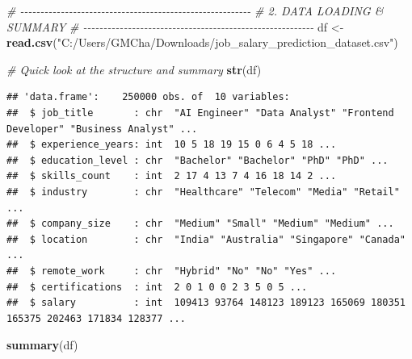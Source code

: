 \documentclass[
]{article}
\newenvironment{Shaded}{\begin{snugshade}}{\end{snugshade}}
\newcommand{\CommentTok}[1]{\textcolor[rgb]{0.56,0.35,0.01}{\textit{#1}}}
\newcommand{\FunctionTok}[1]{\textcolor[rgb]{0.13,0.29,0.53}{\textbf{#1}}}
\newcommand{\NormalTok}[1]{#1}
\newcommand{\OtherTok}[1]{\textcolor[rgb]{0.56,0.35,0.01}{#1}}
\newcommand{\StringTok}[1]{\textcolor[rgb]{0.31,0.60,0.02}{#1}}
\begin{document}
\begin{Shaded}
\begin{Highlighting}[]
\CommentTok{\# {-}{-}{-}{-}{-}{-}{-}{-}{-}{-}{-}{-}{-}{-}{-}{-}{-}{-}{-}{-}{-}{-}{-}{-}{-}{-}{-}{-}{-}{-}{-}{-}{-}{-}{-}{-}{-}{-}{-}{-}{-}{-}{-}{-}{-}{-}{-}{-}{-}{-}{-}{-}{-}{-}{-}{-}{-}}
\CommentTok{\# 2. DATA LOADING \& SUMMARY}
\CommentTok{\# {-}{-}{-}{-}{-}{-}{-}{-}{-}{-}{-}{-}{-}{-}{-}{-}{-}{-}{-}{-}{-}{-}{-}{-}{-}{-}{-}{-}{-}{-}{-}{-}{-}{-}{-}{-}{-}{-}{-}{-}{-}{-}{-}{-}{-}{-}{-}{-}{-}{-}{-}{-}{-}{-}{-}{-}{-}}
\NormalTok{df }\OtherTok{\textless{}{-}} \FunctionTok{read.csv}\NormalTok{(}\StringTok{"C:/Users/GMCha/Downloads/job\_salary\_prediction\_dataset.csv"}\NormalTok{)}

\CommentTok{\# Quick look at the structure and summary}
\FunctionTok{str}\NormalTok{(df)}
\end{Highlighting}
\end{Shaded}

\begin{verbatim}
## 'data.frame':    250000 obs. of  10 variables:
##  $ job_title       : chr  "AI Engineer" "Data Analyst" "Frontend Developer" "Business Analyst" ...
##  $ experience_years: int  10 5 18 19 15 0 6 4 5 18 ...
##  $ education_level : chr  "Bachelor" "Bachelor" "PhD" "PhD" ...
##  $ skills_count    : int  2 17 4 13 7 4 16 18 14 2 ...
##  $ industry        : chr  "Healthcare" "Telecom" "Media" "Retail" ...
##  $ company_size    : chr  "Medium" "Small" "Medium" "Medium" ...
##  $ location        : chr  "India" "Australia" "Singapore" "Canada" ...
##  $ remote_work     : chr  "Hybrid" "No" "No" "Yes" ...
##  $ certifications  : int  2 0 1 0 0 2 3 5 0 5 ...
##  $ salary          : int  109413 93764 148123 189123 165069 180351 165375 202463 171834 128377 ...
\end{verbatim}

\begin{Shaded}
\begin{Highlighting}[]
\FunctionTok{summary}\NormalTok{(df)}
\end{Highlighting}
\end{Shaded}
\end{document}
